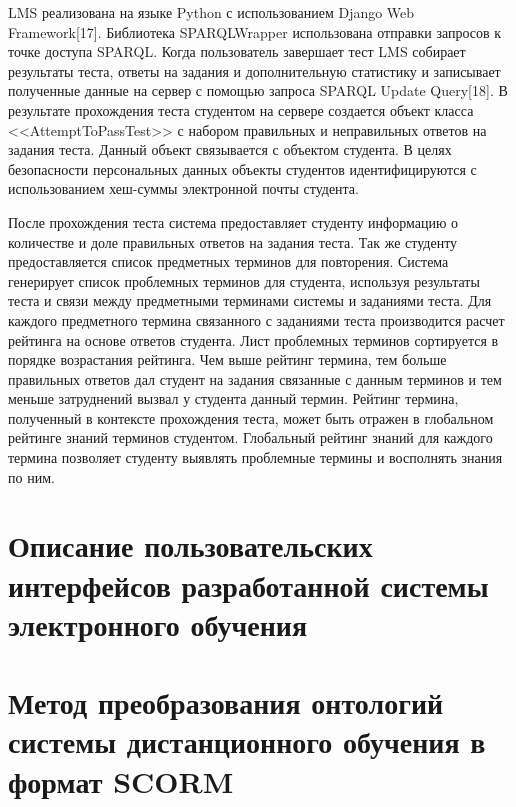 LMS реализована на языке Python с использованием Django Web Framework[17]. Библиотека SPARQLWrapper использована отправки запросов к точке доступа SPARQL. Когда пользователь завершает тест LMS собирает результаты теста, ответы на задания и дополнительную статистику и записывает полученные данные на сервер с помощью запроса SPARQL Update Query[18]. В результате прохождения теста студентом на сервере создается объект класса <<AttemptToPassTest>> с набором правильных и неправильных ответов на задания теста. Данный объект связывается с объектом студента. В целях безопасности персональных данных объекты студентов идентифицируются с использованием хеш-суммы электронной почты студента.

После прохождения теста система предоставляет студенту информацию о количестве и доле правильных ответов на задания теста. Так же студенту предоставляется список предметных терминов для повторения. Система генерирует список проблемных терминов для студента, используя результаты теста и связи между предметными терминами системы и заданиями теста. Для каждого предметного термина связанного с заданиями теста производится расчет рейтинга на основе ответов студента. Лист проблемных терминов сортируется в порядке возрастания рейтинга. Чем выше рейтинг термина, тем больше правильных ответов дал студент на задания связанные с данным терминов и тем меньше затруднений вызвал у студента данный термин. Рейтинг термина, полученный в контексте прохождения теста, может быть отражен в глобальном рейтинге знаний терминов студентом. Глобальный рейтинг знаний для каждого термина позволяет студенту выявлять проблемные термины и восполнять знания по ним.   


\section{Описание пользовательских интерфейсов разработанной системы электронного обучения} \label{sect4_2}




\section{Метод преобразования онтологий системы дистанционного обучения в формат SCORM} \label{sect4_3}



